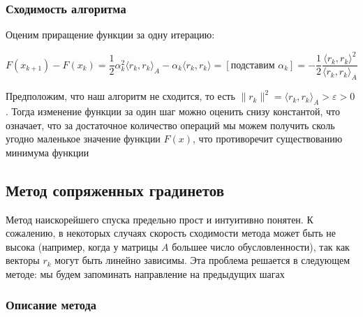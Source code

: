 \subsubsection*{Сходимость алгоритма}

Оценим приращение функции за одну итерацию:

\[
F(x_{k+1}) - F(x_k) = \frac{1}{2}\alpha_k^2 \langle r_k, r_k \rangle_A - \alpha_k \langle r_k, r_k \rangle = [\text{подставим } \alpha_k] = -\frac{1}{2} \frac{\langle r_k, r_k \rangle^2}{\langle r_k, r_k \rangle_A}
\]

Предположим, что наш алгоритм не сходится, то есть $\lVert r_k \rVert^2 = \langle r_k, r_k \rangle_A > \varepsilon > 0$. Тогда изменение функции за один шаг можно оценить снизу константой, что означает, что за достаточное количество операций мы можем получить сколь угодно маленькое значение функции $F(x)$, что противоречит существованию минимума функции

\subsection{Метод сопряженных градинетов}

Метод наискорейшего спуска предельно прост и интуитивно понятен. К сожалению, в некоторых случаях скорость сходимости метода может быть не высока (например, когда у матрицы $A$ большее число обусловленности), так как векторы $r_k$ могут быть линейно зависимы. Эта проблема решается в следующем методе: мы будем запоминать направление на предыдущих шагах

\subsubsection*{Описание метода}

